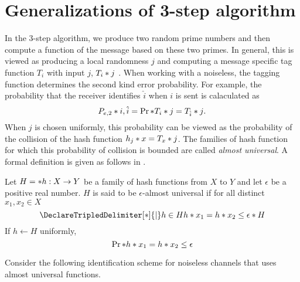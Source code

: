 \section{Generalizations of 3-step algorithm}
In the 3-step algorithm, we produce two random prime numbers and then compute a function of the message based on these two primes. In general, this is viewed as producing a local randomness \(j\) and computing a message specific tag function \(T_i\) with input \(j\), \(\func{T_i}{j}\) \cite{derebeyoglu}. When working with a noiseless, the tagging function determines the second kind error probability. For example, the probability that the receiver identifies \(\hat{i}\) when \(i\) is sent is calaculated as 
\begin{equation*}
    \func{P_{e,2}}{i,\hat{i}} = \prob{\func{T_i}{j} = \func{T_{\hat{i}}}{j}}.
\end{equation*} 
When \(j\) is chosen uniformly, this probability can be viewed as the probability of the collision of the hash function \(\func{h_j}{x} = \func{T_x}{j}\). The families of hash function for which this probability of collision is bounded are called \textit{almost universal}. A formal definition is given as follows in \cite{stinson}.
\begin{definition}
    Let \(H = \set{h : X \to Y}\) be a family of hash functions from \(X\) to \(Y\) and let \(\epsilon\) be a positive real number. \(H\) is said to be \(\epsilon\)-almost universal if for all distinct \(x_1, x_2 \in X\) 
    \begin{equation*}
        \set<h \in H>{\func{h}{x_1} = \func{h}{x_2}} \leq \epsilon \abs{H}
    \end{equation*}
    If \(h \gets H\) uniformly, 
    \begin{equation*}
        \prob{\func{h}{x_1} = \func{h}{x_2}} \leq \epsilon
    \end{equation*}
\end{definition}

Consider the following identification scheme for noiseless channels that uses almost universal functions.

